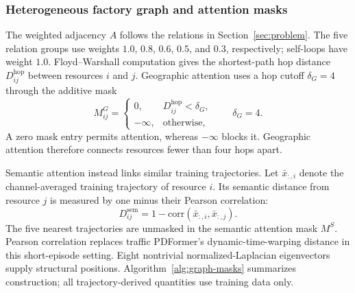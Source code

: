\documentclass[a4paper,fleqn]{cas-dc}
\begin{document}
\subsubsection{Heterogeneous factory graph and attention masks}

The weighted adjacency $A$ follows the relations in Section~\ref{sec:problem}. The five relation groups use weights $1.0$, $0.8$, $0.6$, $0.5$, and $0.3$, respectively; self-loops have weight $1.0$. Floyd--Warshall computation gives the shortest-path hop distance $D^{\mathrm{hop}}_{ij}$ between resources $i$ and $j$. Geographic attention uses a hop cutoff $\delta_G=4$ through the additive mask
\begin{equation}
M^G_{ij}=
\begin{cases}
0, & D^{\mathrm{hop}}_{ij}<\delta_G,\\
-\infty, & \text{otherwise},
\end{cases}
\qquad \delta_G=4.
\end{equation}
A zero mask entry permits attention, whereas $-\infty$ blocks it. Geographic attention therefore connects resources fewer than four hops apart.

Semantic attention instead links similar training trajectories. Let $\bar x_{:,i}$ denote the channel-averaged training trajectory of resource $i$. Its semantic distance from resource $j$ is measured by one minus their Pearson correlation:
\begin{equation}
D^{\mathrm{sem}}_{ij}
=1-\mathrm{corr}(\bar{x}_{:,i},\bar{x}_{:,j}).
\end{equation}
The five nearest trajectories are unmasked in the semantic attention mask $M^S$. Pearson correlation replaces traffic PDFormer's dynamic-time-warping distance in this short-episode setting. Eight nontrivial normalized-Laplacian eigenvectors supply structural positions. Algorithm~\ref{alg:graph-masks} summarizes construction; all trajectory-derived quantities use training data only.
\end{document}
